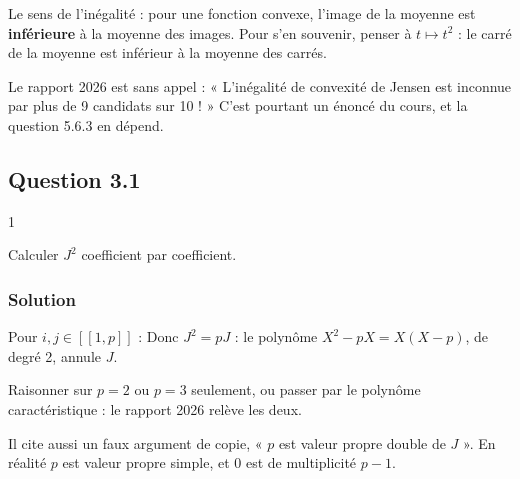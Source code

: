 \documentclass[11pt,a4paper]{article}
\newcommand{\equationajustee}[1]{%
  \sbox{\boiteequation}{$\displaystyle #1$}%
  \ifdim\wd\boiteequation>\linewidth
    \[\resizebox{\linewidth}{!}{\usebox{\boiteequation}}\]%
  \else
    \[#1\]%
  \fi}
\begin{document}
\begin{piege}

Le sens de l'inégalité : pour une fonction convexe, l'image de la moyenne est \textbf{inférieure} à la moyenne des images. Pour s'en souvenir, penser à \(t\mapsto t^2\) : le carré de la moyenne est inférieur à la moyenne des carrés.

\end{piege}

\begin{jury}

Le rapport 2026 est sans appel : « L'inégalité de convexité de Jensen est inconnue par plus de 9 candidats sur 10 ! » C'est pourtant un énoncé du cours, et la question 5.6.3 en dépend.

\end{jury}

\hypertarget{question-3.1}{%
\subsection{Question 3.1}\label{question-3.1}}

\begin{indication}{1}

Calculer \(J^2\) coefficient par coefficient.

\end{indication}

\hypertarget{solution-2}{%
\subsubsection{Solution}\label{solution-2}}

Pour \(i,j\in[\![1,p]\!]\) :
\equationajustee{\begin{aligned}
(J^2)_{ij}&=\sum_{k=1}^p1\cdot1\\
&=p.
\end{aligned}}
Donc \(J^2=pJ\) : le polynôme \(X^2-pX=X(X-p)\), de degré 2, annule \(J\).

\begin{piege}

Raisonner sur \(p=2\) ou \(p=3\) seulement, ou passer par le polynôme caractéristique : le rapport 2026 relève les deux.

Il cite aussi un faux argument de copie, « \(p\) est valeur propre double de \(J\) ». En réalité \(p\) est valeur propre simple, et \(0\) est de multiplicité \(p-1\).

\end{piege}
\end{document}
